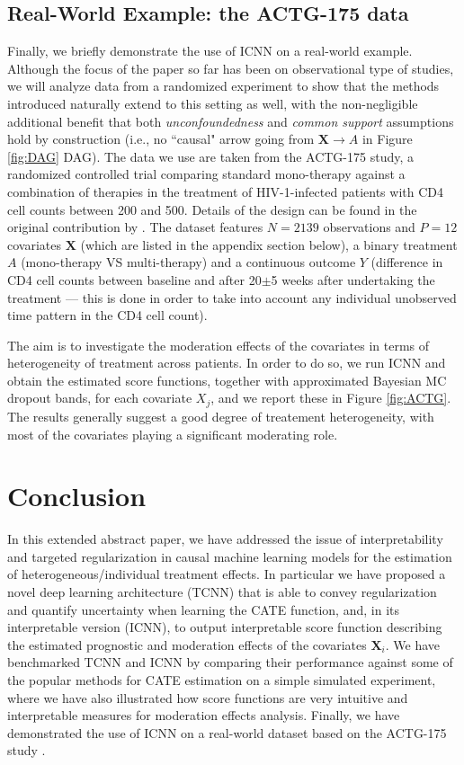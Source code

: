 \documentclass[nohyperref]{article}
\theoremstyle{plain}
\theoremstyle{definition}
\theoremstyle{remark}
\begin{document}
\subsection{Real-World Example: the ACTG-175 data}  \label{sec:ACTG}

Finally, we briefly demonstrate the use of ICNN on a real-world example. Although the focus of the paper so far has been on observational type of studies, we will analyze data from a randomized experiment to show that the methods introduced naturally extend to this setting as well, with the non-negligible additional benefit that both \emph{unconfoundedness} and \emph{common support} assumptions hold by construction (i.e., no ``causal" arrow going from $\bm{X} \rightarrow A$ in Figure \ref{fig:DAG} DAG). The data we use are taken from the ACTG-175 study, a randomized controlled trial comparing standard mono-therapy against a combination of therapies in the treatment of HIV-1-infected patients with CD4 cell counts between 200 and 500. Details of the design can be found in the original contribution by \citet{hammer_1996}. The dataset features $N=2139$ observations and $P=12$ covariates $\bm{X}$ (which are listed in the appendix section below), a binary treatment $A$ (mono-therapy VS multi-therapy) and a continuous outcome $Y$ (difference in CD4 cell counts between baseline and after 20$\pm$5 weeks after undertaking the treatment --- this is done in order to take into account any individual unobserved time pattern in the CD4 cell count). 

The aim is to investigate the moderation effects of the covariates in terms of heterogeneity of treatment across patients. In order to do so, we run ICNN and obtain the estimated score functions, together with approximated Bayesian MC dropout bands, for each covariate $X_j$, and we report these in Figure \ref{fig:ACTG}. The results generally suggest a good degree of treatement heterogeneity, with most of the covariates playing a significant moderating role. 

\section{Conclusion}

In this extended abstract paper, we have addressed the issue of interpretability and targeted regularization in causal machine learning models for the estimation of heterogeneous/individual treatment effects. In particular we have proposed a novel deep learning architecture (TCNN) that is able to convey regularization and quantify uncertainty when learning the CATE function, and, in its interpretable version (ICNN), to output interpretable score function describing the estimated prognostic and moderation effects of the covariates $\bm{X}_i$. We have benchmarked TCNN and ICNN by comparing their performance against some of the popular methods for CATE estimation on a simple simulated experiment, where we have also illustrated how score functions are very intuitive and interpretable measures for moderation effects analysis. Finally, we have demonstrated the use of ICNN on a real-world dataset based on the ACTG-175 study \citep{hammer_1996}.
\end{document}
